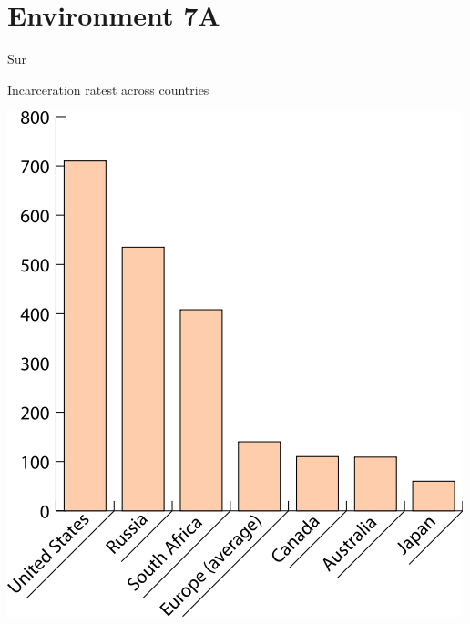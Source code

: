 %
%
%
%
%
\section{Environment 7A}

\begin{chart}{S}{ur}
\caption{Incarceration ratest across countries}
\label{chart:incarceration}
\includegraphics[width=\chartwidth,height=\chartheight]{incarceration}  
\end{chart}

